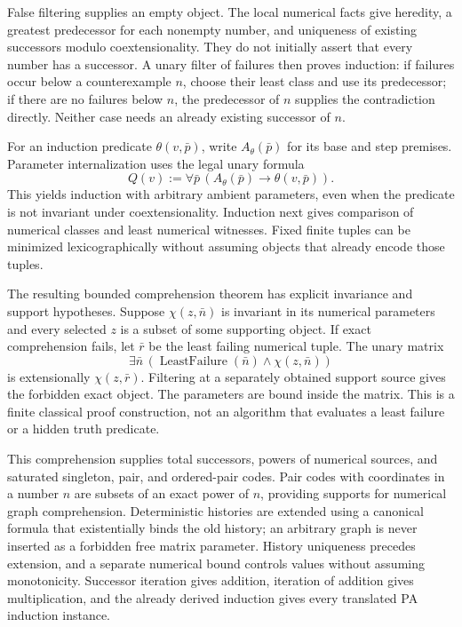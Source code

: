 False filtering supplies an empty object. The local numerical facts give
heredity, a greatest predecessor for each nonempty number, and uniqueness
of existing successors modulo coextensionality. They do not initially
assert that every number has a successor. A unary filter of failures then
proves induction: if failures occur below a counterexample $n$, choose
their least class and use its predecessor; if there are no failures below
$n$, the predecessor of $n$ supplies the contradiction directly. Neither
case needs an already existing successor of $n$.

For an induction predicate $\theta(v,\bar p)$, write
$A_\theta(\bar p)$ for its base and step premises. Parameter
internalization uses the legal unary formula
\[
 Q(v):=\forall\bar p\,
             (A_\theta(\bar p)\to\theta(v,\bar p)).
\]
This yields induction with arbitrary ambient parameters, even when the
predicate is not invariant under coextensionality. Induction next gives
comparison of numerical classes and least numerical witnesses. Fixed
finite tuples can be minimized lexicographically without assuming objects
that already encode those tuples.

The resulting bounded comprehension theorem has explicit invariance and
support hypotheses. Suppose $\chi(z,\bar n)$ is invariant in its numerical
parameters and every selected $z$ is a subset of some supporting object.
If exact comprehension fails, let $\bar r$ be the least failing numerical
tuple. The unary matrix
\[
 \exists\bar n\,
    (\operatorname{LeastFailure}(\bar n)\land\chi(z,\bar n))
\]
is extensionally $\chi(z,\bar r)$. Filtering at a separately obtained
support source gives the forbidden exact object. The parameters are bound
inside the matrix. This is a finite classical proof construction, not an
algorithm that evaluates a least failure or a hidden truth predicate.

This comprehension supplies total successors, powers of numerical
sources, and saturated singleton, pair, and ordered-pair codes. Pair codes
with coordinates in a number $n$ are subsets of an exact power of $n$,
providing supports for numerical graph comprehension. Deterministic
histories are extended using a canonical formula that existentially binds
the old history; an arbitrary graph is never inserted as a forbidden free
matrix parameter. History uniqueness precedes extension, and a separate
numerical bound controls values without assuming monotonicity. Successor
iteration gives addition, iteration of addition gives multiplication, and
the already derived induction gives every translated PA induction instance.

